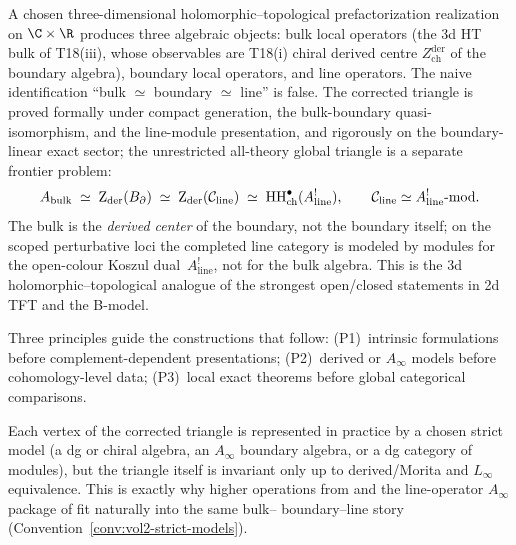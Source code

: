 A chosen three-dimensional holomorphic--topological prefactorization
realization on
$\C \times \R$ produces three algebraic objects: bulk local
operators (the 3d HT bulk of T18(iii), whose observables are
T18(i) chiral derived centre $Z^{\mathrm{der}}_{\mathrm{ch}}$ of the
boundary algebra), boundary local operators, and line operators. The
naive identification ``bulk $\simeq$ boundary $\simeq$ line'' is
false. The corrected triangle is proved formally under compact
generation, the bulk-boundary quasi-isomorphism, and the line-module
presentation, and rigorously on the boundary-linear exact sector; the
unrestricted all-theory global triangle is a separate frontier problem:
\begin{equation}%
\Abulk
\;\simeq\;
\Zder(\Bbound)
\;\simeq\;
\Zder(\cC_{\mathrm{line}})
\;\simeq\;
\HH^\bullet_{\mathrm{ch}}(A^!_{\mathrm{line}}),
\qquad
\cC_{\mathrm{line}}\simeq A^!_{\mathrm{line}}\text{-mod}.
\end{equation}
The bulk is the \emph{derived center} of the boundary, not the
boundary itself; on the scoped perturbative loci the completed line
category is modeled by modules for the open-colour Koszul
dual~$A^!_{\mathrm{line}}$, not for the bulk algebra. This is the 3d
holomorphic--topological analogue of the strongest open/closed
statements in 2d TFT and the B-model.

Three principles guide the constructions that follow: (P1)~intrinsic
formulations before complement-dependent presentations;
(P2)~derived or $A_\infty$ models before cohomology-level data;
(P3)~local exact theorems before global categorical comparisons.

\begin{remark}
Each vertex of the corrected triangle is represented in practice by a
chosen strict model (a dg or chiral algebra, an $A_\infty$ boundary
algebra, or a dg category of modules), but the triangle itself is
invariant only up to derived/Morita and $L_\infty$ equivalence. This
is exactly why higher operations from \cite{GKW24} and the line-operator
$A_\infty$ package of \cite{DNP25} fit naturally into the same bulk--
boundary--line story
(Convention~\ref{conv:vol2-strict-models}).
\end{remark}

